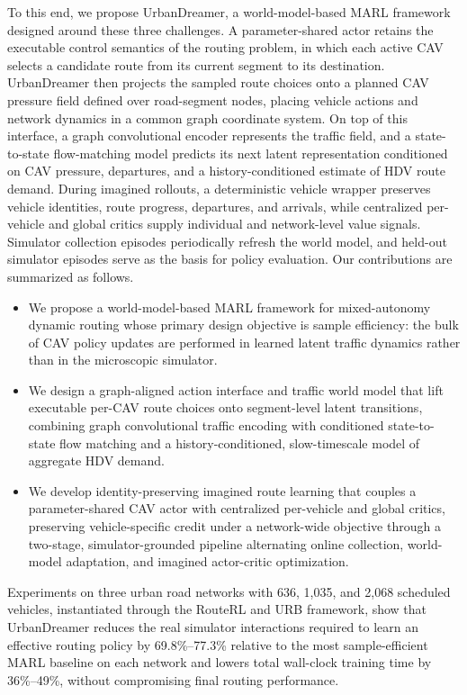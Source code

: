 To this end, we propose UrbanDreamer, a world-model-based MARL framework designed around these three challenges. A parameter-shared actor retains the executable control semantics of the routing problem, in which each active CAV selects a candidate route from its current segment to its destination. UrbanDreamer then projects the sampled route choices onto a planned CAV pressure field defined over road-segment nodes, placing vehicle actions and network dynamics in a common graph coordinate system. On top of this interface, a graph convolutional encoder represents the traffic field, and a state-to-state flow-matching model predicts its next latent representation conditioned on CAV pressure, departures, and a history-conditioned estimate of HDV route demand. During imagined rollouts, a deterministic vehicle wrapper preserves vehicle identities, route progress, departures, and arrivals, while centralized per-vehicle and global critics supply individual and network-level value signals. Simulator collection episodes periodically refresh the world model, and held-out simulator episodes serve as the basis for policy evaluation. Our contributions are summarized as follows.
\begin{itemize}[leftmargin=1.2em,itemsep=2pt,topsep=3pt,parsep=0pt]
\item We propose a world-model-based MARL framework for mixed-autonomy dynamic routing whose primary design objective is sample efficiency: the bulk of CAV policy updates are performed in learned latent traffic dynamics rather than in the microscopic simulator.
\item We design a graph-aligned action interface and traffic world model that lift executable per-CAV route choices onto segment-level latent transitions, combining graph convolutional traffic encoding with conditioned state-to-state flow matching and a history-conditioned, slow-timescale model of aggregate HDV demand.
\item We develop identity-preserving imagined route learning that couples a parameter-shared CAV actor with centralized per-vehicle and global critics, preserving vehicle-specific credit under a network-wide objective through a two-stage, simulator-grounded pipeline alternating online collection, world-model adaptation, and imagined actor-critic optimization.
\end{itemize}
Experiments on three urban road networks with 636, 1,035, and 2,068 scheduled vehicles, instantiated through the RouteRL and URB framework, show that UrbanDreamer reduces the real simulator interactions required to learn an effective routing policy by 69.8\%--77.3\% relative to the most sample-efficient MARL baseline on each network and lowers total wall-clock training time by 36\%--49\%, without compromising final routing performance.
